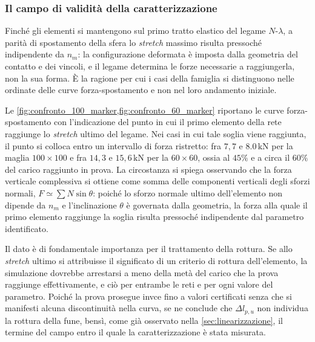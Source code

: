 \subsubsection{Il campo di validità della caratterizzazione}
\label{sec:superamento_stretch_ultimo}

Finché gli elementi si mantengono sul primo tratto elastico del legame $N$-$\lambda$, a parità di spostamento della sfera lo \textit{stretch} massimo risulta pressoché indipendente da $n_m$: la configurazione deformata è imposta dalla geometria del contatto e dei vincoli, e il legame determina le forze necessarie a raggiungerla, non la sua forma. \`E la ragione per cui i casi della famiglia si distinguono nelle ordinate delle curve forza-spostamento e non nel loro andamento iniziale.

Le \cref{fig:confronto_100_marker,fig:confronto_60_marker} riportano le curve forza-spostamento con l'indicazione del punto in cui il primo elemento della rete raggiunge lo \textit{stretch} ultimo del legame. Nei casi in cui tale soglia viene raggiunta, il punto si colloca entro un intervallo di forza ristretto: fra $7,7$ e $8.0\,\text{kN}$ per la maglia $100\times100$ e fra $14,3$ e $15,6\,\text{kN}$ per la $60\times60$, ossia al $45\%$ e a circa il $60\%$ del carico raggiunto in prova. La circostanza si spiega osservando che la forza verticale complessiva si ottiene come somma delle componenti verticali degli sforzi normali, $F \simeq \sum N \sin\theta$: poiché lo sforzo normale ultimo dell'elemento non dipende da $n_m$ e l'inclinazione $\theta$ è governata dalla geometria, la forza alla quale il primo elemento raggiunge la soglia risulta pressoché indipendente dal parametro identificato.  

Il dato è di fondamentale importanza per il trattamento della rottura. Se allo \textit{stretch} ultimo si attribuisse il significato di un criterio di rottura dell'elemento, la simulazione dovrebbe arrestarsi a meno della metà del carico che la prova raggiunge effettivamente, e ciò per entrambe le reti e per ogni valore del parametro. Poiché la prova prosegue invce fino a valori certificati senza che si manifesti alcuna discontinuità nella curva, se ne conclude che $\Delta l_{p,u}$ non individua la rottura della fune, bensì, come già osservato nella \cref{sec:linearizzazione}, il termine del campo entro il quale la caratterizzazione è stata misurata.

